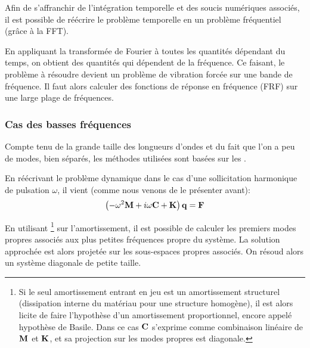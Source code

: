 Afin de s'affranchir de l'intégration temporelle et des soucis numériques associés, il est
possible de réécrire le problème temporelle en un problème fréquentiel (grâce à
la FFT).


\medskip
En appliquant la transformée de Fourier
à toutes les quantités dépendant du temps,
on obtient des quantités qui dépendent de la fréquence.
Ce faisant, le problème à résoudre devient un problème de vibration
forcée sur une bande de fréquence.
Il faut alors calculer des fonctions de réponse en fréquence (FRF) sur une large plage
de fréquences.

\medskip
\subsubsection{Cas des basses fréquences}

Compte tenu de la grande taille des longueurs d'ondes et du fait que l'on a peu de modes, bien séparés,
les méthodes utilisées sont basées sur les .

En réécrivant le problème dynamique dans le cas d'une sollicitation harmonique de pulsation
$\omega$, il vient (comme nous venons de le présenter avant):
\begin{equation}
\left(-\omega^2\MM{M}+i\omega \MM{C}+\MM{K}\right)\VV{q} = \VV{F}
\end{equation}

En utilisant \footnote{%
Si le seul amortissement entrant en jeu est un amortissement structurel (dissipation
interne du matériau pour une structure homogène), il est alors licite de faire
l'hypothèse d'un amortissement proportionnel, encore appelé hypothèse de
Basile. Dans ce cas $\MM{C}$ s'exprime comme combinaison linéaire de $\MM{M}$ et $\MM{K}$,
et sa projection sur les modes propres est diagonale.
} sur l'amortissement, il est possible de calculer les premiers modes propres
associés aux plus petites fréquences propre du système.
La solution approchée est alors projetée sur les sous-espaces propres associés.
On résoud alors un système diagonale de petite taille.

